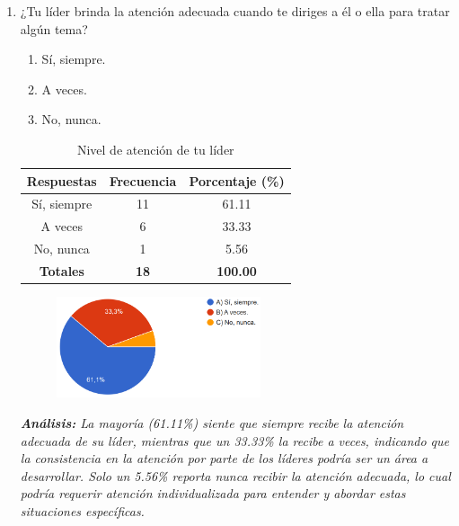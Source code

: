 \documentclass[journal]{IEEEtran}
\begin{document}
\begin{enumerate}
	\item ¿Tu líder brinda la atención adecuada cuando te diriges a él o ella para tratar algún tema?
	\begin{enumerate}
		\item Sí, siempre.
		\item A veces.
		\item No, nunca.
	\end{enumerate}
	\begin{table}[H]
		\renewcommand{\arraystretch}{1.3}
		\centering
		\caption{Nivel de atención de tu líder}
		\begin{tabular}{c c c}
			\hline
			\textbf{Respuestas} & \textbf{Frecuencia} & \textbf{Porcentaje (\%)}\\
			\hline
			Sí, siempre & 11 & 61.11\\
			A veces & 6 & 33.33\\
			No, nunca & 1 &	5.56\\	
			\hline
			\textbf{Totales} &\textbf{18}& \textbf{100.00}\\
			\hline
		\end{tabular}
	\end{table}
	\begin{figure}[h]
		\centering
		\includegraphics[width=06cm]{Pregunta14}
	\end{figure}
	\textit{\textbf{Análisis:} La mayoría (61.11\%) siente que siempre recibe la atención adecuada de su líder, mientras que un 33.33\% la recibe a veces, indicando que la consistencia en la atención por parte de los líderes podría ser un área a desarrollar. Solo un 5.56\% reporta nunca recibir la atención adecuada, lo cual podría requerir atención individualizada para entender y abordar estas situaciones específicas.}\\
	

\end{enumerate}
\end{document}
